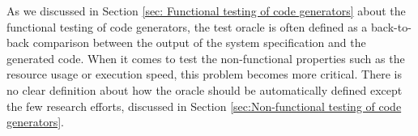 As we discussed in Section \ref{sec: Functional testing of code generators} about the functional testing of code generators, the test oracle is often defined as a back-to-back comparison between the output of the system specification and the generated code.
When it comes to test the non-functional properties such as the resource usage or execution speed, this problem becomes more critical. There is no clear definition about how the oracle should be automatically defined except the few research efforts, discussed in Section \ref{sec:Non-functional testing of code generators}. 





